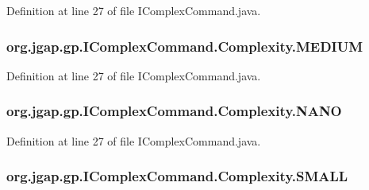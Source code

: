 Definition at line 27 of file I\-Complex\-Command.\-java.

\hypertarget{enumorg_1_1jgap_1_1gp_1_1_i_complex_command_1_1_complexity_abe1155eb313e9cb823b8d5036a412a3d}{
\subsubsection[{M\-E\-D\-I\-U\-M}]{\setlength{\rightskip}{0pt plus 5cm}org.\-jgap.\-gp.\-I\-Complex\-Command.\-Complexity.\-M\-E\-D\-I\-U\-M}}\label{enumorg_1_1jgap_1_1gp_1_1_i_complex_command_1_1_complexity_abe1155eb313e9cb823b8d5036a412a3d}


Definition at line 27 of file I\-Complex\-Command.\-java.

\hypertarget{enumorg_1_1jgap_1_1gp_1_1_i_complex_command_1_1_complexity_ae212971fc8c47fc7794aad627705901f}{
\subsubsection[{N\-A\-N\-O}]{\setlength{\rightskip}{0pt plus 5cm}org.\-jgap.\-gp.\-I\-Complex\-Command.\-Complexity.\-N\-A\-N\-O}}\label{enumorg_1_1jgap_1_1gp_1_1_i_complex_command_1_1_complexity_ae212971fc8c47fc7794aad627705901f}


Definition at line 27 of file I\-Complex\-Command.\-java.

\hypertarget{enumorg_1_1jgap_1_1gp_1_1_i_complex_command_1_1_complexity_aa9b89dc38565c1d7d691b3d3900d9a22}{
\subsubsection[{S\-M\-A\-L\-L}]{\setlength{\rightskip}{0pt plus 5cm}org.\-jgap.\-gp.\-I\-Complex\-Command.\-Complexity.\-S\-M\-A\-L\-L}}\label{enumorg_1_1jgap_1_1gp_1_1_i_complex_command_1_1_complexity_aa9b89dc38565c1d7d691b3d3900d9a22}


